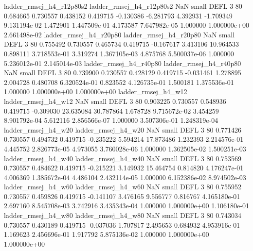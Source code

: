 ladder_rmsej_h4_r12p80s2 ladder_rmsej_h4_r12p80s2                   NaN      small     DEFL                 3 80 0.684665       0.730557 0.438152       0.419715   -0.130386     -6.281793      4.392931    -1.709349   9.131194e-02  1.472901 1.447509e-01     4.173587   7.647982e-05            1.000000    1.000000e+00        2.661498e-02
  ladder_rmsej_h4_r20p80   ladder_rmsej_h4_r20p80                   NaN      small     DEFL                 3 80 0.755492       0.730557 0.465734       0.419715   -0.167617      3.413106     10.964533     0.898111   3.718553e-01  3.319274 1.367105e-03     4.875768   5.500037e-06            1.000000    5.236012e-01        2.145014e-03
  ladder_rmsej_h4_r40p80   ladder_rmsej_h4_r40p80                   NaN      small     DEFL                 3 80 0.739900       0.730557 0.428129       0.419715   -0.031461      1.278895      2.004728     0.480708   6.320524e-01  0.823552 4.126735e-01     1.500181   1.375536e-01            1.000000    1.000000e+00        1.000000e+00
     ladder_rmsej_h4_w12      ladder_rmsej_h4_w12                   NaN      small     DEFL                 3 80 0.903225       0.730557 0.548936       0.419715   -0.309030     23.635084     30.787864     1.678728   9.715672e-02  3.454259 8.901792e-04     5.612116   2.856566e-07            1.000000    3.507306e-01        1.248319e-04
     ladder_rmsej_h4_w20      ladder_rmsej_h4_w20                   NaN      small     DEFL                 3 80 0.771426       0.730557 0.494732       0.419715   -0.235222      5.594214     17.873486     1.232393   2.214576e-01  4.445752 2.826773e-05     4.973055   3.760028e-06            1.000000    1.362505e-02        1.500251e-03
     ladder_rmsej_h4_w40      ladder_rmsej_h4_w40                   NaN      small     DEFL                 3 80 0.753569       0.730557 0.484622       0.419715   -0.215221      3.149932     15.464754     0.814820   4.176247e-01  4.006369 1.385672e-04     4.486104   2.432114e-05            1.000000    6.152386e-02        8.974502e-03
     ladder_rmsej_h4_w60      ladder_rmsej_h4_w60                   NaN      small     DEFL                 3 80 0.755952       0.730557 0.459826       0.419715   -0.141107      3.476165      9.556777     0.816767   4.165180e-01  2.697160 8.545708e-03     3.742916   3.435343e-04            1.000000    1.000000e+00        1.106180e-01
     ladder_rmsej_h4_w80      ladder_rmsej_h4_w80                   NaN      small     DEFL                 3 80 0.743034       0.730557 0.430189       0.419715   -0.037036      1.707817      2.495653     0.684932   4.953916e-01  1.169623 2.456696e-01     1.917792   5.875136e-02            1.000000    1.000000e+00        1.000000e+00
